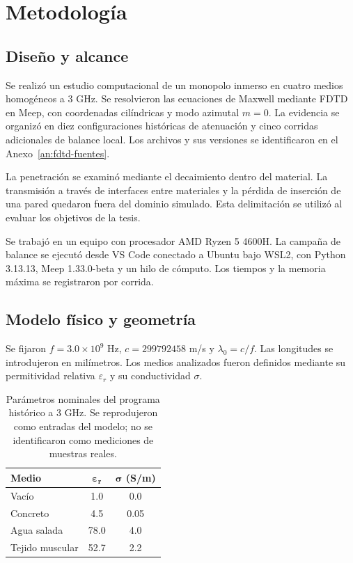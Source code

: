 \chapter{Metodología}
\section{Diseño y alcance}
Se realizó un estudio computacional de un monopolo inmerso en cuatro medios homogéneos a 3 GHz. Se resolvieron las ecuaciones de Maxwell mediante FDTD en Meep, con coordenadas cilíndricas y modo azimutal $m=0$. La evidencia se organizó en diez configuraciones históricas de atenuación y cinco corridas adicionales de balance local. Los archivos y sus versiones se identificaron en el Anexo~\ref{an:fdtd-fuentes}.

La penetración se examinó mediante el decaimiento dentro del material. La transmisión a través de interfaces entre materiales y la pérdida de inserción de una pared quedaron fuera del dominio simulado. Esta delimitación se utilizó al evaluar los objetivos de la tesis.

Se trabajó en un equipo con procesador AMD Ryzen 5 4600H. La campaña de balance se ejecutó desde VS Code conectado a Ubuntu bajo WSL2, con Python 3.13.13, Meep 1.33.0-beta y un hilo de cómputo. Los tiempos y la memoria máxima se registraron por corrida.

\section{Modelo físico y geometría}
Se fijaron $f=3.0\times10^9$ Hz, $c=299792458$ m/s y $\lambda_0=c/f$. Las longitudes se introdujeron en milímetros.
Los medios analizados fueron definidos mediante su permitividad relativa $\varepsilon_r$ y su conductividad $\sigma$.

\begin{table}[H]
\centering
\begin{tabular}{|l|c|c|}
\hline
\textbf{Medio} & $\boldsymbol{\varepsilon_r}$ & $\boldsymbol{\sigma}$ (\textbf{S/m}) \\ \hline
Vacío & 1.0 & 0.0 \\ \hline
Concreto & 4.5 & 0.05 \\ \hline
Agua salada & 78.0 & 4.0 \\ \hline
Tejido muscular & 52.7 & 2.2 \\ \hline
\end{tabular}
\caption{Parámetros nominales del programa histórico a 3 GHz. Se reprodujeron como entradas del modelo; no se identificaron como mediciones de muestras reales.}
\label{tab:materiales_metodologia}
\end{table}

